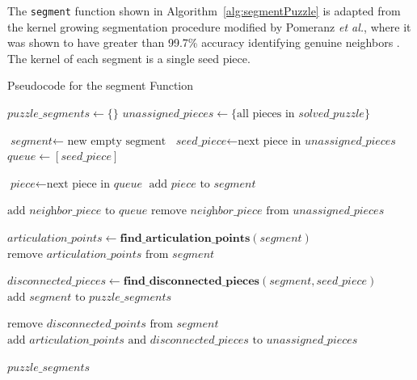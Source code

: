 The \texttt{segment} function shown in Algorithm~\ref{alg:segmentPuzzle} is adapted from the kernel growing segmentation procedure modified by Pomeranz \textit{et al.}, where it was shown to have greater than 99.7\% accuracy identifying genuine neighbors \cite{pomeranz2011}. The kernel of each segment is a single seed piece.

\begin{algorithm}
\caption{Pseudocode for the segment Function}\label{alg:segmentPuzzle}
\begin{algorithmic}[1]
    \State $\textit{puzzle\_segments} \gets \{ \}$
    \State $\textit{unassigned\_pieces} \gets \{ \text{all pieces in } \textit{solved\_puzzle} \}$
\item[]
        \State $\textit{segment} \gets \text{ new empty segment}$
        \State $\textit{seed\_piece} \gets \text{next piece in } \textit{unassigned\_pieces}$
        \State $\textit{queue} \gets [\textit{seed\_piece}]$
\item[]
            \State $\textit{piece} \gets \text{next piece in }\textit{queue}$
            \State $\text{add } \textit{piece} \text{ to } \textit{segment}$
\item[]
            		\State $\text{add } \textit{neighbor\_piece} \text{ to } \textit{queue}$
            		\State $\text{remove } \textit{neighbor\_piece} \text{ from } \textit{unassigned\_pieces}$
            	\EndIf
            \EndFor
        \EndWhile
\item[]
        \State $\textit{articulation\_points} \gets \textbf{find\_articulation\_points}(\textit{segment})$
        \State $\text{remove } \textit{articulation\_points} \text{ from } \textit{segment}$
\item[]
		\State $\textit{disconnected\_pieces} \gets \textbf{find\_disconnected\_pieces}(\textit{segment},\textit{seed\_piece})$        
        \State $\text{add } \textit{segment} \text{ to } \textit{puzzle\_segments}$
\item[]
		\State $\text{remove } \textit{disconnected\_points} \text{ from } \textit{segment}$
        \State $\text{add } \textit{articulation\_points} \text{ and } \textit{disconnected\_pieces} \text{ to } \textit{unassigned\_pieces}$
    \EndWhile
\item[]
    \State \Return $\textit{puzzle\_segments}$
\EndFunction
\end{algorithmic}
\end{algorithm}

